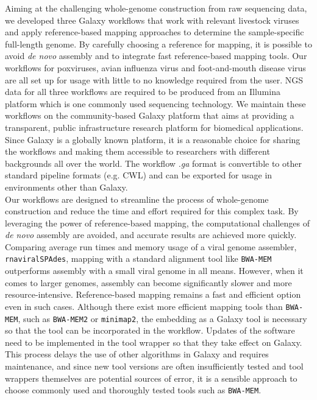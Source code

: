Aiming at the challenging whole-genome construction from raw sequencing data, we developed three Galaxy workflows that work with relevant livestock viruses and apply reference-based mapping approaches to determine the sample-specific full-length genome. By carefully choosing a reference for mapping, it is possible to avoid \textit{de novo} assembly and to integrate fast reference-based mapping tools. Our workflows for poxviruses, avian influenza virus and foot-and-mouth disease virus are all set up for usage with little to no knowledge required from the user. \ac{NGS} data for all three workflows are required to be produced from an Illumina platform which is one commonly used sequencing technology. We maintain these workflows on the community-based Galaxy platform that aims at providing a transparent, public infrastructure research platform for biomedical applications. Since Galaxy is a globally known platform, it is a reasonable choice for sharing the workflows and making them accessible to researchers with different backgrounds all over the world. The workflow \textit{.ga} format is convertible to other standard pipeline formats (e.g. \ac{CWL}) and can be exported for usage in environments other than Galaxy.\\
Our workflows are designed to streamline the process of whole-genome construction and reduce the time and effort required for this complex task. By leveraging the power of reference-based mapping, the computational challenges of \textit{de novo} assembly are avoided, and accurate results are achieved more quickly. Comparing average run times and memory usage of a viral genome assembler, \texttt{rnaviralSPAdes}, mapping with a standard alignment tool like \texttt{BWA-MEM} outperforms assembly with a small viral genome in all means. However, when it comes to larger genomes, assembly can become significantly slower and more resource-intensive. Reference-based mapping remains a fast and efficient option even in such cases. Although there exist more efficient mapping tools than \texttt{BWA-MEM}, such as \texttt{BWA-MEM2} or \texttt{minimap2}, the embedding as a Galaxy tool is necessary so that the tool can be incorporated in the workflow. Updates of the software need to be implemented in the tool wrapper so that they take effect on Galaxy. This process delays the use of other algorithms in Galaxy and requires maintenance, and since new tool versions are often insufficiently tested and tool wrappers themselves are potential sources of error, it is a sensible approach to choose commonly used and thoroughly tested tools such as \texttt{BWA-MEM}.\\
